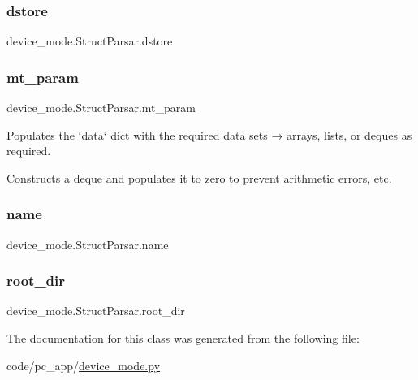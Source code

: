 \subsubsection{\texorpdfstring{dstore}{dstore}}
{\footnotesize\ttfamily device\+\_\+mode.\+Struct\+Parsar.\+dstore}

\mbox{\label{classdevice__mode_1_1StructParsar_ad41412b88f13b25fc0dffcf5c62b4259}} 
\subsubsection{\texorpdfstring{mt\+\_\+param}{mt\_param}}
{\footnotesize\ttfamily device\+\_\+mode.\+Struct\+Parsar.\+mt\+\_\+param}

\begin{DoxyVerb}Populates the `data` dict with the required data sets → arrays, lists, or deques as required.
\end{DoxyVerb}
\begin{DoxyVerb}Constructs a deque and populates it to zero to prevent arithmetic errors, etc.
\end{DoxyVerb}
 \mbox{\label{classdevice__mode_1_1StructParsar_a937fe4559444433d8cff05910c16a4b6}} 
\subsubsection{\texorpdfstring{name}{name}}
{\footnotesize\ttfamily device\+\_\+mode.\+Struct\+Parsar.\+name}

\mbox{\label{classdevice__mode_1_1StructParsar_a1e7769eb90fbb3821659d58b5607d17f}} 
\subsubsection{\texorpdfstring{root\+\_\+dir}{root\_dir}}
{\footnotesize\ttfamily device\+\_\+mode.\+Struct\+Parsar.\+root\+\_\+dir}



The documentation for this class was generated from the following file\+:\begin{DoxyCompactItemize}
\item 
code/pc\+\_\+app/\hyperlink{device__mode_8py}{device\+\_\+mode.\+py}\end{DoxyCompactItemize}
